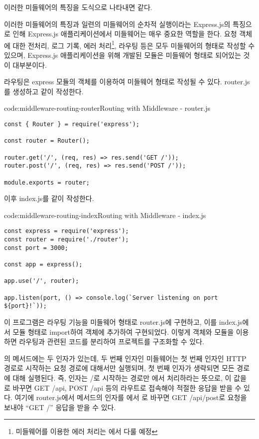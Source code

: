 이러한 미들웨어의 특징을 도식으로 나타내면 \와 같다.


이러한 미들웨어의 특징과 일련의 미들웨어의 순차적 실행이라는 Express.js의 특징으로 인해 Express.js 애플리케이션에서 미들웨어는 매우 중요한 역할을 한다. 요청 객체에 대한 전처리, 로그 기록, 에러 처리\footnote{미들웨어를 이용한 에러 처리는 에서 다룰 예정}, 라우팅 등은 모두 미들웨어의 형태로 작성할 수 있으며, Express.js 애플리케이션을 위해 개발된 모듈은 미들웨어 형태로 되어있는 것이 대부분이다.

라우팅은 express 모듈의  객체를 이용하여 미들웨어 형태로 작성될 수 있다. router.js를 생성하고 \와 같이 작성한다.

\begin{codeenv}{code:middleware-routing-router}{Routing with Middleware - router.js}\begin{verbatim}
const { Router } = require('express');

const router = Router();

router.get('/', (req, res) => res.send('GET /'));
router.post('/', (req, res) => res.send('POST /'));

module.exports = router;
\end{verbatim}
\end{codeenv}
\clearpage

이후 index.js를 \와 같이 작성한다.

\begin{codeenv}{code:middleware-routing-index}{Routing with Middleware - index.js}\begin{verbatim}
const express = require('express');
const router = require('./router');
const port = 3000;

const app = express();

app.use('/', router);

app.listen(port, () => console.log(`Server listening on port ${port}!`));
\end{verbatim}
\end{codeenv}

이 프로그램은 라우팅 기능을 미들웨어 형태로 router.js에 구현하고, 이를 index.js에서 모듈 형태로 import하여  객체에 추가하여 구현되었다. 이렇게  객체와 모듈을 이용하면 라우팅과 관련된 코드를 분리하여 프로젝트를 구조화할 수 있다.

의  메서드에는 두 인자가 있는데, 두 번째 인자인 미들웨어는 첫 번째 인자인 HTTP 경로로 시작하는 요청 경로에 대해서만 실행되며, 첫 번째 인자가 생략되면 모든 경로에 대해 실행된다. 즉,  인자는 /로 시작하는 경로만 에서 처리하라는 뜻으로, 이 값을 로 바꾸면 GET /api, POST /api 등의 라우트로 접속해야 적절한 응답을 받을 수 있다. 여기에 router.js에서  메서드의 인자를 에서 로 바꾸면 GET /api/post로 요청을 보내야 ``GET /'' 응답을 받을 수 있다.

